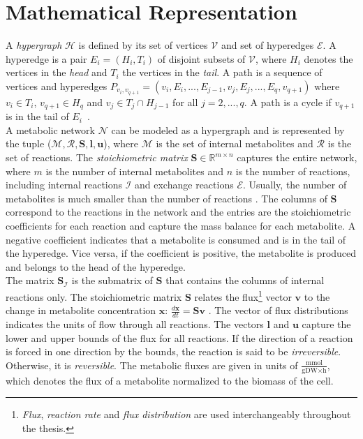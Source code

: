 \section{Mathematical Representation} \label{section:mathematical_representation}
A \textit{hypergraph} $\mathscr{H}$ is defined by its set of vertices $\mathscr{V}$ and set of hyperedges $\mathscr{E}$. A hyperedge is a pair $E_i= (H_i,T_i)$ %
of disjoint subsets of $\mathscr{V}$, where $H_i$ denotes the vertices in the \textit{head} and $T_i$ the vertices in the \textit{tail}. A path is a sequence of vertices and hyperedges $P_{v_i,v_{q+1}} = (v_i, E_i, ..., E_{j-1}, v_j, E_{j}, ..., E_q, v_{q+1})$ where $v_i \in T_i$, $v_{q+1} \in H_q$ and $v_j \in T_j \cap H_{j-1}$ for all $j = 2,...,q$. A path is a cycle if $v_{q+1}$ is in the tail of $E_i$~\cite{gallo_directed_1993}.\\ %
A metabolic network $\mathcal{N}$ can be modeled as a hypergraph and is represented by the tuple ($\mathcal{M}, \mathcal{R}, \mathbf S, \mathbf l, \mathbf u$), where $\mathcal M$ is the set of internal metabolites and $\mathcal{R}$ is the set of reactions. The \textit{stoichiometric matrix} $\mathbf S \in \mathbb{R}^{m\times n}$ captures the entire network, where $m$ is the number of internal metabolites and $n$ is the number of reactions, including internal reactions $\mathcal{I}$ and exchange reactions $\mathcal{E}$. Usually, the number of metabolites is much smaller than the number of reactions \cite{intro_computational_systems_biology}. 
The columns of $\mathbf S$ correspond to the reactions in the network and the entries are the stoichiometric coefficients for each reaction and capture the mass balance for each metabolite. A negative coefficient indicates that a metabolite is consumed and is in the tail of the hyperedge. Vice versa, if the coefficient is positive, the metabolite is produced and belongs to the head of the hyperedge.\\
The matrix $\mathbf S_\mathcal{I}$ is the submatrix of $\mathbf S$ that contains the columns of internal reactions only. 
The stoichiometric matrix $\mathbf S$ relates the flux\footnote{\textit{Flux}, \textit{reaction rate} and \textit{flux distribution} are used interchangeably throughout the thesis.} vector $\mathbf v$ to the change in metabolite concentration $\mathbf x$: $\frac{d \mathbf x}{dt} = \mathbf S \mathbf v$ \cite{noor_removing_2018}. The vector of flux distributions indicates the units of flow through all reactions. The vectors $\mathbf l$ and $\mathbf u$ capture the lower and upper bounds of the flux for all reactions. If the direction of a reaction is forced in one direction by the bounds, the reaction is said to be \textit{irreversible}. Otherwise, it is \textit{reversible}.
The metabolic fluxes are given in units of $\frac{\text{mmol}}{\text{gDW} \times \text{h}}$, which denotes the flux of a metabolite normalized to the biomass of the cell.

